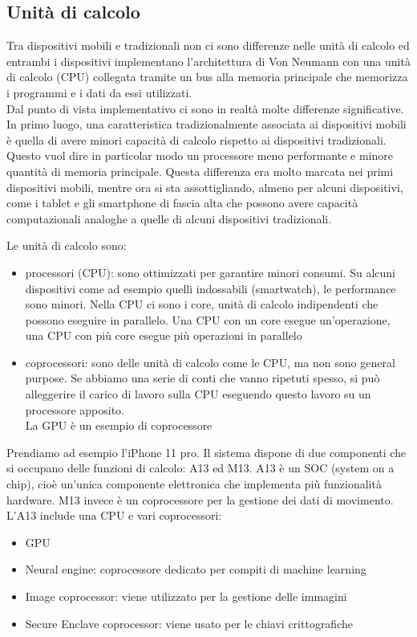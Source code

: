 \subsection{Unità di calcolo}
Tra dispositivi mobili e tradizionali non ci sono differenze nelle unità di calcolo ed entrambi i dispositivi implementano l’architettura di Von Neumann con una unità di calcolo (CPU) collegata tramite un bus alla memoria principale che memorizza i programmi e i dati da essi utilizzati.
\\ Dal punto di vista implementativo ci sono in realtà molte differenze significative. In primo luogo, una caratteristica tradizionalmente associata ai dispositivi mobili è
quella di avere minori capacità di calcolo rispetto ai dispositivi tradizionali. Questo vuol dire in particolar modo un processore meno performante e minore quantità di memoria principale. Questa differenza era molto marcata nei primi dispositivi mobili, mentre ora si sta assottigliando, almeno per alcuni dispositivi, come i tablet e gli smartphone di fascia alta che possono avere capacità computazionali analoghe a quelle di alcuni dispositivi tradizionali. 

Le unità di calcolo sono:
\begin{itemize}
    \item processori (CPU): sono ottimizzati per garantire minori consumi. Su alcuni dispositivi come ad esempio quelli indossabili (smartwatch), le performance sono minori. Nella CPU ci sono i core, unità di calcolo indipendenti che possono eseguire in parallelo. Una CPU con un core esegue un'operazione, una CPU con più core esegue più operazioni in parallelo
    \item coprocessori: sono delle unità di calcolo come le CPU, ma non sono general purpose. 
    Se abbiamo una serie di conti che vanno ripetuti spesso, si può alleggerire il carico di lavoro sulla CPU eseguendo questo lavoro su un processore apposito. 
    \\ La GPU è un esempio di coprocessore
\end{itemize}

Prendiamo ad esempio l'iPhone 11 pro. Il sistema dispone di due componenti che si occupano delle funzioni di calcolo: A13 ed M13. A13 è un SOC (system on a chip), cioè un'unica componente elettronica che implementa più funzionalità hardware.  M13 invece è un coprocessore per la gestione dei dati di movimento.
\\ L'A13 include una CPU e vari coprocessori:
\begin{itemize}
    \item GPU
    \item Neural engine: coprocessore dedicato per compiti di machine learning
    \item Image coprocessor: viene utilizzato per la gestione delle immagini
    \item Secure Enclave coprocessor: viene usato per le chiavi crittografiche 
\end{itemize}

